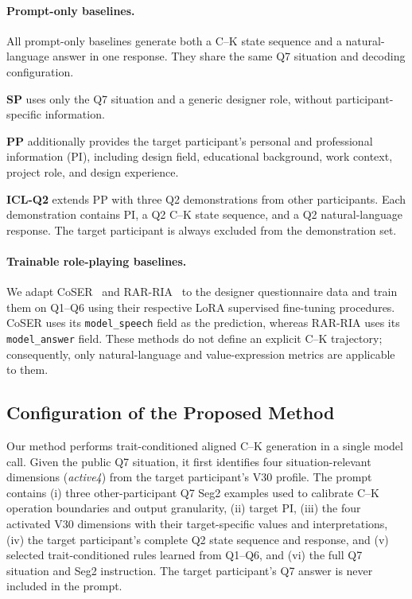\paragraph{Prompt-only baselines.}
All prompt-only baselines generate both a C--K state sequence and a
natural-language answer in one response. They share the same Q7 situation and
decoding configuration.

\textbf{SP} uses only the Q7 situation and a generic designer role, without
participant-specific information.

\textbf{PP} additionally provides the target participant's personal and
professional information (PI), including design field, educational
background, work context, project role, and design experience.

\textbf{ICL-Q2} extends PP with three Q2 demonstrations from other
participants. Each demonstration contains PI, a Q2 C--K state sequence, and a
Q2 natural-language response. The target participant is always excluded from
the demonstration set.

\paragraph{Trainable role-playing baselines.}
We adapt CoSER~\citep{wang2025coser} and RAR-RIA~\citep{tang2026thinking} to
the designer questionnaire data and train them on Q1--Q6 using their
respective LoRA supervised fine-tuning procedures. CoSER uses its
\texttt{model\_speech} field as the prediction, whereas RAR-RIA uses its
\texttt{model\_answer} field. These methods do not define an explicit C--K
trajectory; consequently, only natural-language and value-expression metrics
are applicable to them.

\subsection{Configuration of the Proposed Method}
\label{sec:proposed_configuration}

Our method performs trait-conditioned aligned C--K generation in a single
model call. Given the public Q7
situation, it first identifies four situation-relevant dimensions
(\emph{active4}) from the target participant's V30 profile. The prompt contains
(i) three other-participant Q7 Seg2 examples used to calibrate C--K operation
boundaries and output granularity, (ii) target PI, (iii) the four activated
V30 dimensions with their target-specific values and interpretations,
(iv) the target participant's complete Q2 state sequence and response, and
(v) selected trait-conditioned rules learned from Q1--Q6, and (vi) the full
Q7 situation and Seg2 instruction. The target participant's Q7 answer is
never included in the prompt.

